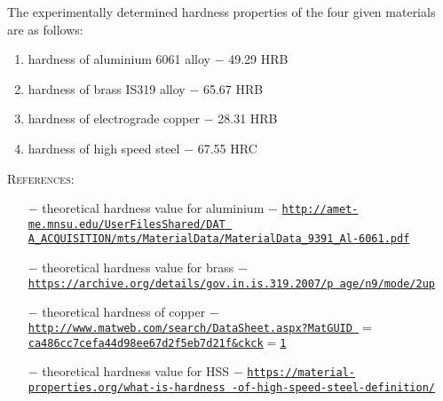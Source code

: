\documentclass[a4paper, 11pt]{article}
\begin{document}
The experimentally determined hardness properties of the four given materials are as follows:
	\begin{enumerate}[label=\roman*)]
		\itemsep0em
		\item hardness of aluminium 6061 alloy $-$ 49.29 HRB
		\item hardness of brass IS319 alloy $-$ 65.67 HRB
		\item hardness of electrograde copper $-$ 28.31 HRB
		\item hardness of high speed steel $-$ 67.55 HRC
	\end{enumerate}
\textsc{References:} 
	\begin{itemize}
	\itemsep0em
		\item[$-$] theoretical hardness value for aluminium $-$ \href{http://amet-me.mnsu.edu/UserFilesShared/DATA_ACQUISITION/mts/MaterialData/MaterialData_9391_Al-6061.pdf}{\texttt{http://amet-me.mnsu.edu/UserFilesShared/DAT A\_ACQUISITION/mts/MaterialData/MaterialData\_9391\_Al-6061.pdf}}
		\item[$-$] theoretical hardness value for brass $-$ \href{https://archive.org/details/gov.in.is.319.2007/page/n9/mode/2up}{\texttt{https://archive.org/details/gov.in.is.319.2007/p age/n9/mode/2up}}
		\item[$-$] theoretical hardness of copper $-$ \href{http://www.matweb.com/search/DataSheet.aspx?MatGUID=ca486cc7cefa44d98ee67d2f5eb7d21f&ckck=1}{\texttt{http://www.matweb.com/search/DataSheet.aspx?MatGUID $=$ca486cc7cefa44d98ee67d2f5eb7d21f\&ckck$=$1}}
		\item[$-$] theoretical hardness value for HSS $-$ \href{https://material-properties.org/what-is-hardness-of-high-speed-steel-definition/}{\texttt{https://material-properties.org/what-is-hardness -of-high-speed-steel-definition/}}
	\end{itemize}
\end{document}
